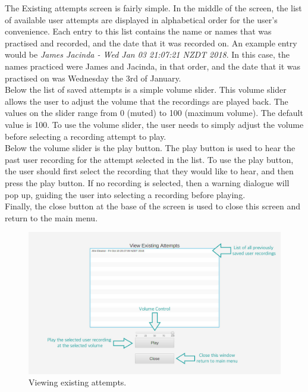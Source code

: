 \documentclass{article}
\begin{document}
The Existing attempts screen is fairly simple. In the middle of the screen, the
list of available user attempts are displayed in alphabetical order for the
user's convenience. Each entry to this list contains the name or names that was
practised and recorded, and the date that it was recorded on. An example entry
would be {\em James Jacinda - Wed Jan 03 21:07:21 NZDT 2018}. In this case, the
names practiced were James and Jacinda, in that order, and the date that it was
practised on was Wednesday the 3rd of January. \\

Below the list of saved attempts is a simple volume slider. This volume slider
allows the user to adjust the volume that the  recordings are played back. The
values on the slider range from 0 (muted) to 100 (maximum volume). The default
value is 100. To use the  volume slider, the user needs to simply adjust the
volume before selecting a recording attempt to play. \\

Below the volume slider is the play button. The play button is used to hear the
past user recording for the attempt selected in the list. To use the play
button, the user should first select the recording that they would like to hear,
and then press the play button. If no recording is selected, then a warning
dialogue will pop up, guiding the user into selecting a recording  before
playing. \\

Finally, the close button at the base of the screen is used to close this screen
and return to the main menu.

\begin{figure}[H]
	\includegraphics[width=\textwidth]{images/16_existing-attempts.jpg}
	\caption{Viewing existing attempts.}
	\label{existingattempts}
\end{figure}
\end{document}
